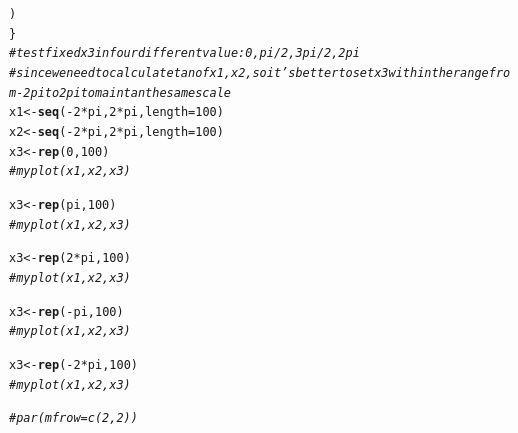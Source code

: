 \documentclass{article}\usepackage[]{graphicx}\usepackage[]{color}
\makeatletter
\newcommand{\hlnum}[1]{\textcolor[rgb]{0.686,0.059,0.569}{#1}}%
\newcommand{\hlcom}[1]{\textcolor[rgb]{0.678,0.584,0.686}{\textit{#1}}}%
\newcommand{\hlopt}[1]{\textcolor[rgb]{0,0,0}{#1}}%
\newcommand{\hlstd}[1]{\textcolor[rgb]{0.345,0.345,0.345}{#1}}%
\newcommand{\hlkwb}[1]{\textcolor[rgb]{0.69,0.353,0.396}{#1}}%
\newcommand{\hlkwc}[1]{\textcolor[rgb]{0.333,0.667,0.333}{#1}}%
\newcommand{\hlkwd}[1]{\textcolor[rgb]{0.737,0.353,0.396}{\textbf{#1}}}%
\newenvironment{kframe}{%
 \def\at@end@of@kframe{}%
 \ifinner\ifhmode%
  \def\at@end@of@kframe{\end{minipage}}%
  \begin{minipage}{\columnwidth}%
 \fi\fi%
 \def\FrameCommand##1{\hskip\@totalleftmargin \hskip-\fboxsep
 \colorbox{shadecolor}{##1}\hskip-\fboxsep
     \hskip-\linewidth \hskip-\@totalleftmargin \hskip\columnwidth}%
 \MakeFramed {\advance\hsize-\width
   \@totalleftmargin\z@ \linewidth\hsize
   \@setminipage}}%
 {\par\unskip\endMakeFramed%
 \at@end@of@kframe}
\newenvironment{knitrout}{}{} %
\makeatother
\begin{document}
\begin{knitrout}
\begin{kframe}
\begin{alltt}
  \hlstd{)}
\hlstd{\}}
\hlcom{#test fixed x3 in four different value: 0,pi/2, 3pi/2, 2pi}
\hlcom{#since we need to calculate tan of x1,x2, so it's better to set x3 within the range from -2pi to 2pi to maintan the same scale}
\hlstd{x1} \hlkwb{<-} \hlkwd{seq}\hlstd{(}\hlopt{-}\hlnum{2}\hlopt{*}\hlstd{pi,} \hlnum{2}\hlopt{*}\hlstd{pi,} \hlkwc{length}\hlstd{=} \hlnum{100}\hlstd{)}
\hlstd{x2} \hlkwb{<-} \hlkwd{seq}\hlstd{(}\hlopt{-}\hlnum{2}\hlopt{*}\hlstd{pi,} \hlnum{2}\hlopt{*}\hlstd{pi,} \hlkwc{length}\hlstd{=} \hlnum{100}\hlstd{)}
\hlstd{x3} \hlkwb{<-} \hlkwd{rep}\hlstd{(}\hlnum{0}\hlstd{,}\hlnum{100}\hlstd{)}
\hlcom{#myplot(x1,x2,x3)}

\hlstd{x3} \hlkwb{<-} \hlkwd{rep}\hlstd{(pi,}\hlnum{100}\hlstd{)}
\hlcom{#myplot(x1,x2,x3)}

\hlstd{x3} \hlkwb{<-} \hlkwd{rep}\hlstd{(}\hlnum{2}\hlopt{*}\hlstd{pi,}\hlnum{100}\hlstd{)}
\hlcom{#myplot(x1,x2,x3)}

\hlstd{x3} \hlkwb{<-} \hlkwd{rep}\hlstd{(}\hlopt{-}\hlstd{pi,}\hlnum{100}\hlstd{)}
\hlcom{#myplot(x1,x2,x3)}

\hlstd{x3} \hlkwb{<-} \hlkwd{rep}\hlstd{(}\hlopt{-}\hlnum{2}\hlopt{*}\hlstd{pi,}\hlnum{100}\hlstd{)}
\hlcom{#myplot(x1,x2,x3)}

\hlcom{# par(mfrow=c(2,2))}




\end{alltt}
\end{kframe}
\end{knitrout}
\end{document}
